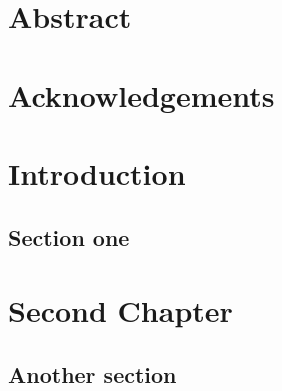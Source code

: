 \documentclass[12pt]{report}
\begin{document}
\clearpage
\setcounter{page}{2}

\chapter*{Abstract}
\lipsum[1]

\chapter*{Acknowledgements}
\lipsum[1]

\begin{doublespace}
\renewcommand*{\contentsname}{Table of Contents}
\tableofcontents
{}
\end{doublespace}


\chapter{Introduction}
\lipsum[1]
\section{Section one}
\lipsum[1]

\chapter{Second Chapter}
\lipsum[1]
\section{Another section}
\lipsum[1]
\end{document}
